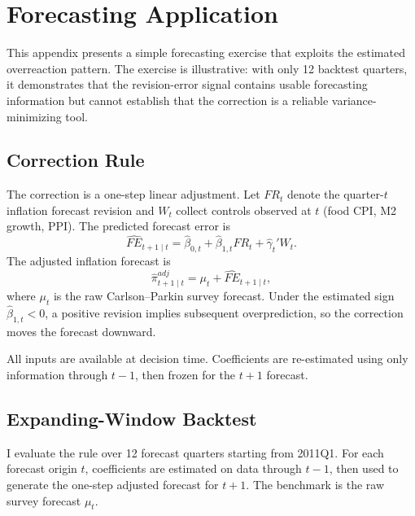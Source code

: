 \section{Forecasting Application}\label{app:forecasting}

This appendix presents a simple forecasting exercise that exploits the
estimated overreaction pattern. The exercise is illustrative: with only
12 backtest quarters, it demonstrates that the revision-error signal
contains usable forecasting information but cannot establish that the
correction is a reliable variance-minimizing tool.

\subsection{Correction Rule}

The correction is a one-step linear adjustment. Let $FR_t$ denote the
quarter-$t$ inflation forecast revision and $W_t$ collect controls
observed at $t$ (food CPI, M2 growth, PPI). The predicted forecast error
is
\begin{equation}\label{eq:policy_rule_forecasting}
  \widehat{FE}_{t+1 \mid t}
  = \hat{\beta}_{0,t} + \hat{\beta}_{1,t} FR_t + \hat{\gamma}_t' W_t .
\end{equation}
The adjusted inflation forecast is
\begin{equation}\label{eq:adjusted_forecast_forecasting}
  \widehat{\pi}^{adj}_{t+1 \mid t}
  = \mu_t + \widehat{FE}_{t+1 \mid t},
\end{equation}
where $\mu_t$ is the raw Carlson--Parkin survey forecast. Under the
estimated sign $\hat{\beta}_{1,t} < 0$, a positive revision implies
subsequent overprediction, so the correction moves the forecast downward.

All inputs are available at decision time. Coefficients are re-estimated
using only information through $t-1$, then frozen for the $t+1$ forecast.



\subsection{Expanding-Window Backtest}

I evaluate the rule over 12 forecast quarters starting from 2011Q1. For
each forecast origin $t$, coefficients are estimated on data through
$t-1$, then used to generate the one-step adjusted forecast for $t+1$.
The benchmark is the raw survey forecast $\mu_t$.

